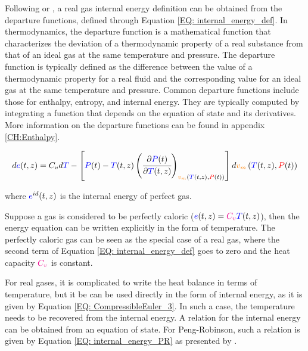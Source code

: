 \documentclass[../Article_Model_Parameters.tex]{subfiles}
\begin{document}
			Following \citet{Elliott2011} or \citet{Gmehling2019}, a real gas internal energy definition can be obtained from the departure functions, defined through Equation \ref{EQ: internal_energy_def}. In thermodynamics, the departure function is a mathematical function that characterizes the deviation of a thermodynamic property of a real substance from that of an ideal gas at the same temperature and pressure. The departure function is typically defined as the difference between the value of a thermodynamic property for a real fluid and the corresponding value for an ideal gas at the same temperature and pressure. Common departure functions include those for enthalpy, entropy, and internal energy. They are typically computed by integrating a function that depends on the equation of state and its derivatives. More information on the departure functions can be found in appendix \ref{CH:Enthalpy}.

			{\footnotesize
				\begin{equation}
					d{\color{blue}e}(t,z)=C_vd{\color{blue}T}-\left[{\color{blue}P}(t)-{\color{blue}T}(t,z)\left(\cfrac{\partial {\color{blue}P}(t)}{\partial {\color{blue}T}(t,z)}\right)_{{\color{orange}v_m}\left({\color{blue}T}(t,z), {\color{red}P}(t)\right)}\right]d{\color{orange}v_m}\left({\color{blue}T}(t,z), {\color{red}P}(t)\right)
					\label{EQ: internal_energy_def}
				\end{equation} }
			
			where ${\color{blue}e}^{id}(t,z)$ is the internal energy of perfect gas.
			
			Suppose a gas is considered to be perfectly caloric (${\color{blue}e}(t,z)={\color{magenta}C_v} {\color{blue}T}(t,z)$), then the energy equation can be written explicitly in the form of temperature. The perfectly caloric gas can be seen as the special case of a real gas, where the second term of Equation \ref{EQ: internal_energy_def} goes to zero and the heat capacity ${\color{magenta}C_v}$ is constant.
			
			For real gases, it is complicated to write the heat balance in terms of temperature, but it be can be used directly in the form of internal energy, as it is given by Equation \ref{EQ: CompressibleEuler_3}. In such a case, the temperature needs to be recovered from the internal energy. A relation for the internal energy can be obtained from an equation of state. For Peng-Robinson, such a relation is given by Equation \ref{EQ: internal_energy_PR} as presented by \citet{Elliott2011}.
			
\end{document}
